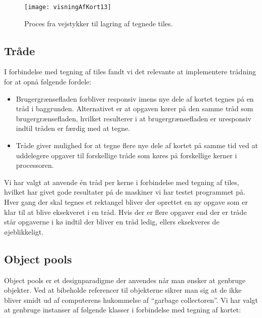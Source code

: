 \begin{figure}[h]
	\centering
	\texttt{[image: visningAfKort13]}
	\captionsetup{width=0.8\textwidth}
	\caption{Proces fra vejstykker til lagring af tegnede tiles.}
	\label{figur:visningAfKort13}
\end{figure}

\subsection{Tråde}
\label{subsec:traade}

I forbindelse med tegning af tiles fandt vi det relevante at implementere trådning for at opnå følgende fordele:

\begin{itemize}
	\item Brugergrænsefladen forbliver responsiv imens nye dele af kortet tegnes på en tråd i baggrunden. Alternativet er at opgaven kører på den samme tråd som brugergrænsefladen, hvilket resulterer i at brugergrænsefladen er uresponsiv indtil tråden er færdig med at tegne.
	\item Tråde giver mulighed for at tegne flere nye dele af kortet på samme tid ved at uddelegere opgaver til forskellige tråde som køres på forskellige kerner i processoren.
\end{itemize}

Vi har valgt at anvende én tråd per kerne i forbindelse med tegning af tiles, hvilket har givet gode resultater på de maskiner vi har testet programmet på. Hver gang der skal tegnes et rektangel bliver der oprettet en ny opgave som er klar til at blive eksekveret i en tråd. Hvis der er flere opgaver end der er tråde står opgaverne i kø indtil der bliver en tråd ledig, ellers eksekveres de øjeblikkeligt.

\subsection{Object pools}
\label{subsec:objectPools}

Object pools er et designparadigme der anvendes når man ønsker at genbruge objekter. Ved at bibeholde referencer til objekterne sikrer man sig at de ikke bliver smidt ud af computerens hukommelse af ``garbage collectoren''. Vi har valgt at genbruge instanser af følgende klasser i forbindelse med tegning af kortet:

